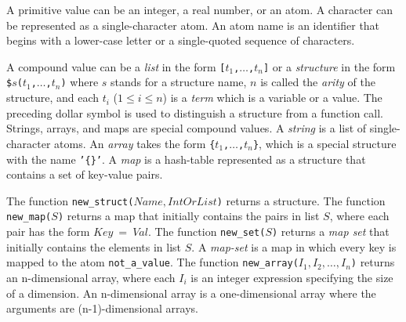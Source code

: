 A primitive value can be an integer, a real number, or an atom. A character can be represented as a single-character atom.  An atom name is an identifier that begins with a lower-case letter or a single-quoted sequence of characters. 

A compound value can be a \emph{list} in the form \texttt{[$t_1$,$\ldots$,$t_{n}$]} or a \emph{structure} in the form \texttt{\$$s$($t_1$,$\ldots$,$t_{n}$)} where $s$ stands for a structure name, $n$ is called the \emph{arity} of the structure, and each $t_i$ ($1\le i \le n$) is a \emph{term} which is a variable or a value. The preceding dollar symbol is used to distinguish a structure from a function call. Strings, arrays, and maps are special compound values. A \emph{string} is a list of single-character atoms. An \emph{array} takes the form \texttt{\{$t_1$,$\ldots$,$t_{n}$\}}, which is a special structure with the name \texttt{'\{\}'}. A \emph{map} is a hash-table represented as a structure that contains a set of key-value pairs.

The function \texttt{new\_struct($Name,IntOrList$)} returns a structure. The function \texttt{new\_map($S$)} returns a map that initially contains the pairs in list $S$, where each pair has the form $Key\ =\ Val$. The function \texttt{new\_set($S$)} returns a \emph{map set} that initially contains the elements in list $S$. A \emph{map-set}  is a map in which every key is mapped to the atom \texttt{not\_a\_value}. The function \texttt{new\_array($I_1,I_2,\ldots,I_{n}$)} returns an n-dimensional array, where each $I_i$ is an integer expression specifying the size of a dimension. An n-dimensional array is a one-dimensional array where the arguments are (n-1)-dimensional arrays. 

